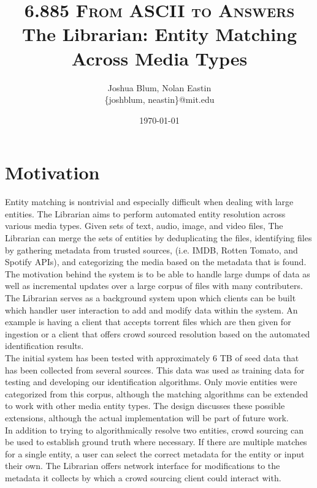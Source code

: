 \documentclass[paper=a4, fontsize=11pt]{scrartcl} %
\title{ 
\normalfont \normalsize 
\textsc{6.885 From ASCII to Answers} %
\horrule{0.5pt} %
\large The Librarian: Entity Matching Across Media Types %
\horrule{1pt} %
}
\author{Joshua Blum, Nolan Eastin \\ \{joshblum, neastin\}@mit.edu}
\date{\normalsize\today} %
\numberwithin{equation}{section} %
\numberwithin{figure}{section} %
\numberwithin{table}{section} %
\begin{document}
\maketitle %

\section{Motivation}
Entity matching is nontrivial and especially difficult when dealing with large entities. The Librarian aims to perform automated entity resolution across various media types. Given sets of text, audio, image, and video files, The Librarian can merge the sets of entities by deduplicating the files, identifying files by gathering metadata from trusted sources, (i.e. IMDB, Rotten Tomato, and Spotify APIs), and categorizing the media based on the metadata that is found. \\

The motivation behind the system is to be able to handle large dumps of data as well as incremental updates over a large corpus of files with many contributers. The Librarian serves as a background system upon which clients can be built which handler user interaction to add and modify data within the system. An example is having a client that accepts torrent files which are then given for ingestion or a client that offers crowd sourced resolution based on the automated identification results.\\

The initial system has been tested with approximately 6 TB of seed data that has been collected from several sources. This data was used as training data for testing and developing our identification algorithms. Only movie entities were categorized from this corpus, although the matching algorithms can be extended to work with other media entity types. The design discusses these possible extensions, although the actual implementation will be part of future work.\\

In addition to trying to algorithmically resolve two entities, crowd sourcing can be used to establish ground truth where necessary. If there are multiple matches for a single entity, a user can select the correct metadata for the entity or input their own. The Librarian offers network interface for modifications to the metadata it collects by which a crowd sourcing client could interact with.\\
\end{document}
